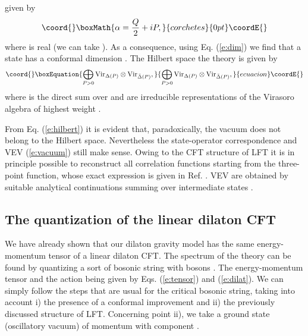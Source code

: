 \documentclass[a4paper,aps,prd,twocolumn,groupedaddress]{revtex4}
\begin{document}
given by
\begin{displaymath}\coord{}\boxMath{
\alpha = \frac{Q}{2} + iP,
}{corchetes}{0pt}\coordE{}\end{displaymath}
where \coordHE{} is real (we can take \coordHE{}). As a consequence, using
Eq. (\ref{e:dim}) we find that a state \myHighlight{$|\alpha >$}\coordHE{} has a conformal
dimension \coordHE{}. The Hilbert space  the theory
is given by
\begin{equation}\coord{}\boxEquation{\label{e:hilbert}
\bigoplus_{P>0} \text{Vir}_{\Delta(P)}\otimes 
\text{Vir}_{\bar\Delta(P)},
}{\bigoplus_{P>0} \text{Vir}_{\Delta(P)}\otimes 
\text{Vir}_{\bar\Delta(P)},
}{ecuacion}\coordE{}\end{equation}
where \coordHE{} is the direct sum over \coordHE{} and
\coordHE{} are irreducible representations of the
Virasoro algebra of highest weight \coordHE{}.

From Eq. (\ref{e:hilbert}) it is evident that, paradoxically, the
vacuum \myHighlight{$|0\rangle$}\coordHE{} does not belong to the Hilbert space.  Nevertheless
the state-operator correspondence and VEV (\ref{e:vacuum}) still make
sense. Owing to the CFT structure of LFT it is in principle
possible to reconstruct all correlation functions starting from the
three-point function, whose exact expression is given in
Ref. \cite{do}. VEV are obtained by suitable analytical continuations
summing over intermediate states \cite{tesc}.

\subsection{The quantization of the linear dilaton CFT}

We have already shown that our dilaton gravity model has the same
energy-momentum tensor of a linear dilaton CFT.  The spectrum of the
theory can be found by quantizing a sort of bosonic string with \coordHE{}
bosons \coordHE{}. The energy-momentum tensor and the action being given
by Eqs. (\ref{e:tensor}) and (\ref{e:dilat}).  We can simply follow
the steps that are usual for the critical bosonic string, taking into
account i) the presence of a conformal improvement and ii) the
previously discussed structure of LFT.  Concerning point ii), we take
a ground state (oscillatory vacuum) \coordHE{} of momentum \coordHE{} with
component \coordHE{}.
\end{document}
